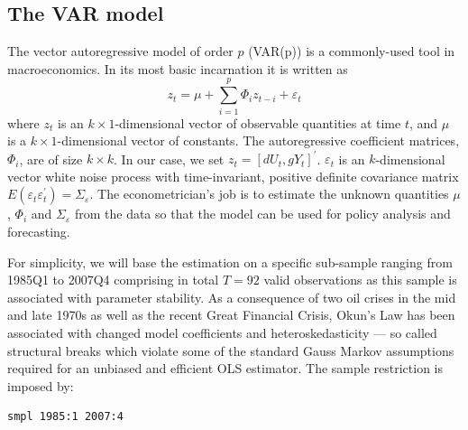 \documentclass[11pt]{article}
\begin{document}
\subsection{The VAR model}
The vector autoregressive model of order $ p $ (VAR(p)) is a commonly-used tool in macroeconomics. In its most basic incarnation it is written as
\begin{equation}
\label{eq:VAR}
	z_t = \mu + \sum_{i=1}^p \Phi_i z_{t-i} + \varepsilon_t
\end{equation}
where $z_t$ is an $k \times 1$-dimensional vector of observable quantities at time $t$, and $ \mu $ is a $k \times 1$-dimensional vector of constants. The autoregressive coefficient matrices, $\Phi_i$, are of size $ k\times k $. In our case, we set $z_t=\left[dU_t, gY_t\right]^\prime$. %
$\varepsilon_t$ is an $k$-dimensional vector white noise process with time-invariant, positive definite covariance matrix $ E(\varepsilon_t \varepsilon^\prime_t)=\Sigma_\varepsilon $. The econometrician's job is to estimate the unknown quantities $\mu$, $\Phi_i$ and $ \Sigma_\varepsilon $ from the data so that the model can be used for policy analysis and forecasting.


%

For simplicity, we will base the estimation on a specific sub-sample ranging from 1985Q1 to 2007Q4 comprising in total $ T=92 $ valid observations as this sample is associated with parameter stability. As a consequence of two oil crises in the mid and late 1970s as well as the recent Great Financial Crisis, Okun's Law has been associated with changed model coefficients and heteroskedasticity --- so called structural breaks which violate some of the standard Gauss Markov assumptions required for an unbiased and efficient OLS estimator. The sample restriction is imposed by:
\begin{Verbatim}[baselinestretch=0.75, fontsize=\small]
smpl 1985:1 2007:4
\end{Verbatim}
\end{document}
